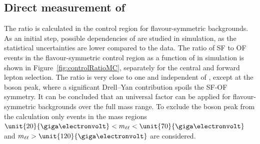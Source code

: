 \subsection{Direct measurement of \Rsfof}
The ratio \Rsfof is calculated in the control region for flavour-symmetric backgrounds. As an initial step, possible dependencies of \Rsfof are studied in simulation, as the statistical uncertainties are lower compared to the data. The ratio of SF to OF events in the flavour-symmetric control region as a function of \mll in simulation is shown in Figure~\ref{fig:controlRatioMC}, separately for the central and forward lepton selection. The ratio is very close to one and independent of \mll, except at the \Z boson peak, where a significant Drell--Yan contribution spoils the SF-OF symmetry. It can be concluded that an universal factor can be applied for flavour-symmetric backgrounds over the full mass range. To exclude the \Z boson peak from the calculation only events in the mass regions $\unit{20}{\giga\electronvolt}< \mll < \unit{70}{\giga\electronvolt}$ and $\mll > \unit{120}{\giga\electronvolt}$ are considered.   	
